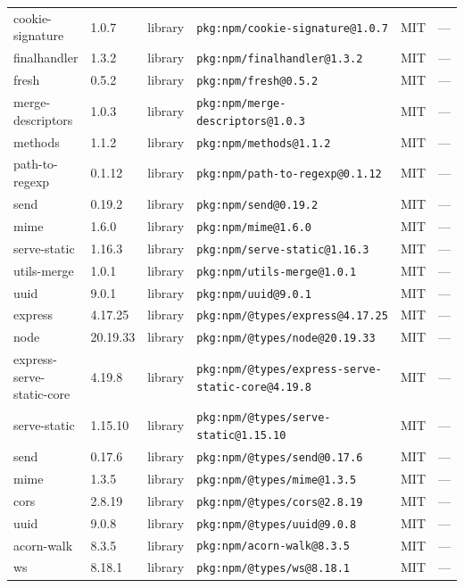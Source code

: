 \documentclass[11pt,a4paper]{article}
\begin{document}
\begin{longtable}{|p{4cm}|p{2cm}|p{1.6cm}|p{5cm}|p{1.5cm}|p{3.5cm}|}
\raggedright cookie-signature & 1.0.7 & library & \small\texttt{pkg:npm/cookie-signature@1.0.7} & MIT & \small — \\
\raggedright finalhandler & 1.3.2 & library & \small\texttt{pkg:npm/finalhandler@1.3.2} & MIT & \small — \\
\raggedright fresh & 0.5.2 & library & \small\texttt{pkg:npm/fresh@0.5.2} & MIT & \small — \\
\raggedright merge-descriptors & 1.0.3 & library & \small\texttt{pkg:npm/merge-descriptors@1.0.3} & MIT & \small — \\
\raggedright methods & 1.1.2 & library & \small\texttt{pkg:npm/methods@1.1.2} & MIT & \small — \\
\raggedright path-to-regexp & 0.1.12 & library & \small\texttt{pkg:npm/path-to-regexp@0.1.12} & MIT & \small — \\
\raggedright send & 0.19.2 & library & \small\texttt{pkg:npm/send@0.19.2} & MIT & \small — \\
\raggedright mime & 1.6.0 & library & \small\texttt{pkg:npm/mime@1.6.0} & MIT & \small — \\
\raggedright serve-static & 1.16.3 & library & \small\texttt{pkg:npm/serve-static@1.16.3} & MIT & \small — \\
\raggedright utils-merge & 1.0.1 & library & \small\texttt{pkg:npm/utils-merge@1.0.1} & MIT & \small — \\
\raggedright uuid & 9.0.1 & library & \small\texttt{pkg:npm/uuid@9.0.1} & MIT & \small — \\
\raggedright express & 4.17.25 & library & \small\texttt{pkg:npm/@types/express@4.17.25} & MIT & \small — \\
\raggedright node & 20.19.33 & library & \small\texttt{pkg:npm/@types/node@20.19.33} & MIT & \small — \\
\raggedright express-serve-static-core & 4.19.8 & library & \small\texttt{pkg:npm/@types/express-serve-static-core@4.19.8} & MIT & \small — \\
\raggedright serve-static & 1.15.10 & library & \small\texttt{pkg:npm/@types/serve-static@1.15.10} & MIT & \small — \\
\raggedright send & 0.17.6 & library & \small\texttt{pkg:npm/@types/send@0.17.6} & MIT & \small — \\
\raggedright mime & 1.3.5 & library & \small\texttt{pkg:npm/@types/mime@1.3.5} & MIT & \small — \\
\raggedright cors & 2.8.19 & library & \small\texttt{pkg:npm/@types/cors@2.8.19} & MIT & \small — \\
\raggedright uuid & 9.0.8 & library & \small\texttt{pkg:npm/@types/uuid@9.0.8} & MIT & \small — \\
\raggedright acorn-walk & 8.3.5 & library & \small\texttt{pkg:npm/acorn-walk@8.3.5} & MIT & \small — \\
\raggedright ws & 8.18.1 & library & \small\texttt{pkg:npm/@types/ws@8.18.1} & MIT & \small — \\
\end{longtable}
\end{document}
